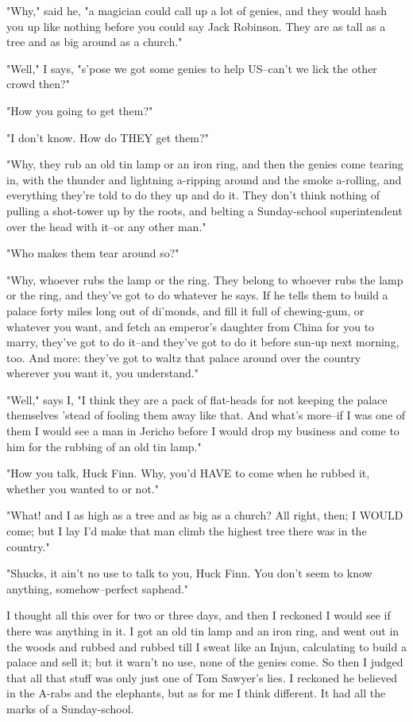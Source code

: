 "Why," said he, "a magician could call up a lot of genies, and they would
hash you up like nothing before you could say Jack Robinson.  They are as
tall as a tree and as big around as a church."

"Well," I says, "s'pose we got some genies to help US--can't we lick the
other crowd then?"

"How you going to get them?"

"I don't know.  How do THEY get them?"

"Why, they rub an old tin lamp or an iron ring, and then the genies come
tearing in, with the thunder and lightning a-ripping around and the smoke
a-rolling, and everything they're told to do they up and do it.  They
don't think nothing of pulling a shot-tower up by the roots, and belting
a Sunday-school superintendent over the head with it--or any other man."

"Who makes them tear around so?"

"Why, whoever rubs the lamp or the ring.  They belong to whoever rubs the
lamp or the ring, and they've got to do whatever he says.  If he tells
them to build a palace forty miles long out of di'monds, and fill it full
of chewing-gum, or whatever you want, and fetch an emperor's daughter
from China for you to marry, they've got to do it--and they've got to do
it before sun-up next morning, too.  And more:  they've got to waltz that
palace around over the country wherever you want it, you understand."

"Well," says I, "I think they are a pack of flat-heads for not keeping
the palace themselves 'stead of fooling them away like that.  And what's
more--if I was one of them I would see a man in Jericho before I would
drop my business and come to him for the rubbing of an old tin lamp."

"How you talk, Huck Finn.  Why, you'd HAVE to come when he rubbed it,
whether you wanted to or not."

"What! and I as high as a tree and as big as a church?  All right, then;
I WOULD come; but I lay I'd make that man climb the highest tree there
was in the country."

"Shucks, it ain't no use to talk to you, Huck Finn.  You don't seem to
know anything, somehow--perfect saphead."

I thought all this over for two or three days, and then I reckoned I
would see if there was anything in it.  I got an old tin lamp and an iron
ring, and went out in the woods and rubbed and rubbed till I sweat like
an Injun, calculating to build a palace and sell it; but it warn't no
use, none of the genies come.  So then I judged that all that stuff was
only just one of Tom Sawyer's lies.  I reckoned he believed in the A-rabs
and the elephants, but as for me I think different.  It had all the marks
of a Sunday-school.




